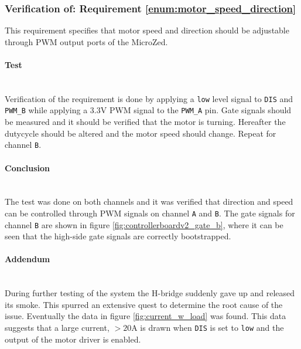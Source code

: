 
\subsubsection{Verification of: Requirement \ref{enum:motor_speed_direction}} %
\label{subs:requirement_enum:motor_speed_direction}
This requirement specifies that motor speed and direction should be adjustable through PWM output ports of the MicroZed.

\paragraph{Test}~\\
Verification of the requirement is done by applying a \texttt{low} level signal to \texttt{DIS} and \texttt{PWM\_B} while applying a 3.3V PWM signal to the \texttt{PWM\_A} pin.
Gate signals should be measured and it should be verified that the motor is turning.
Hereafter the dutycycle should be altered and the motor speed should change.
Repeat for channel \texttt{B}.

\paragraph{Conclusion}~\\
The test was done on both channels and it was verified that direction and speed can be controlled through PWM signals on channel \texttt{A} and \texttt{B}.
The gate signals for channel \texttt{B} are shown in figure \ref{fig:controllerboardv2_gate_b}, where it can be seen that the high-side gate signals are correctly bootstrapped.

\paragraph{Addendum}~\\
During further testing of the system the H-bridge suddenly gave up and released its smoke.
This spurred an extensive quest to determine the root cause of the issue.
Eventually the data in figure \ref{fig:current_w_load} was found.
This data suggests that a large current, $>20$A is drawn when \texttt{DIS} is set to \texttt{low} and the output of the motor driver is enabled.


